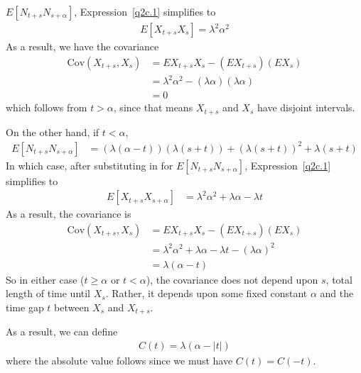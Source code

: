 \documentclass[12pt]{article}
\theoremstyle{plain}
\theoremstyle{definition}
\theoremstyle{remark}
\begin{document}
\begin{enumerate}
\begin{enumerate}
\begin{enumerate}
        $E[N_{t+s}N_{s+\alpha}]$, Expression~\ref{q2c.1} simplifies to
        \begin{align*}
          E[X_{t+s} X_s] = \lambda^2 \alpha^2
        \end{align*}
        As a result, we have the covariance
        \begin{align*}
          \text{Cov}(X_{t+s},X_s) &= EX_{t+s}X_s - (EX_{t+s})(EX_s)\\
          &= \lambda^2\alpha^2 -(\lambda \alpha)(\lambda \alpha) \\
          &= 0
        \end{align*}
        which follows from $t>\alpha$, since that means $X_{t+s}$ and
        $X_s$ have disjoint intervals.

        On the other hand, if $t<\alpha$,
        \begin{align*}
          E[N_{t+s}N_{s+\alpha}]
            &= (\lambda(\alpha-t)) (\lambda (s+t))
              + (\lambda(s+t))^2 + \lambda (s+t)
        \end{align*}
        In which case, after substituting in for
        $E[N_{t+s}N_{s+\alpha}]$, Expression~\ref{q2c.1} simplifies to
        \begin{align*}
          E[X_{t+s}X_{s+\alpha}]
            &= \lambda^2\alpha^2 + \lambda \alpha - \lambda t
        \end{align*}
        As a result, the covariance is
        \begin{align*}
          \text{Cov}(X_{t+s}, X_s)
            &= EX_{t+s}X_s - (EX_{t+s})(EX_s)\\
            &= \lambda^2\alpha^2 + \lambda \alpha - \lambda t - (\lambda\alpha)^2\\
            &= \lambda (\alpha - t)
        \end{align*}
        So in either case ($t\geq \alpha$ or $t<\alpha$), the covariance
        does not depend upon $s$, total length of time until $X_s$.
        Rather, it depends upon some fixed constant $\alpha$ and the
        time gap $t$ between $X_{s}$ and $X_{t+s}$.

        As a result, we can define
        \begin{align*}
        C(t) = \lambda(\alpha - |t|)
        \end{align*}
        where the absolute value follows since we must have $C(t) =
        C(-t)$.


\end{enumerate}
\end{enumerate}
\end{enumerate}
\end{document}

